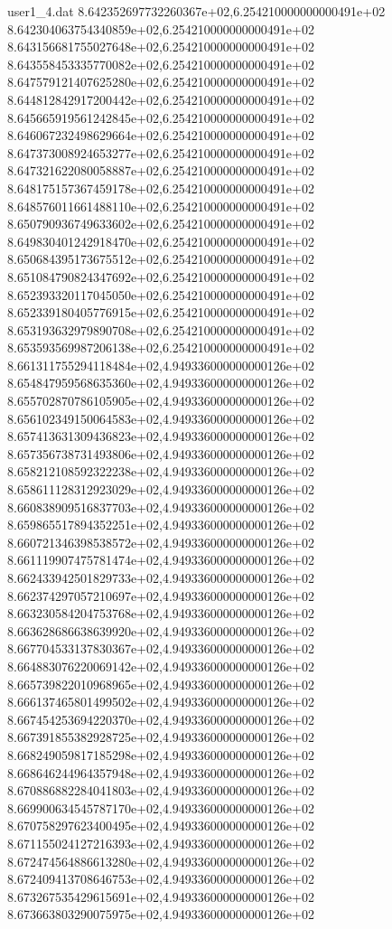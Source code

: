 \begin{filecontents}{user1_4.dat}
8.642352697732260367e+02,6.254210000000000491e+02
8.642304063754340859e+02,6.254210000000000491e+02
8.643156681755027648e+02,6.254210000000000491e+02
8.643558453335770082e+02,6.254210000000000491e+02
8.647579121407625280e+02,6.254210000000000491e+02
8.644812842917200442e+02,6.254210000000000491e+02
8.645665919561242845e+02,6.254210000000000491e+02
8.646067232498629664e+02,6.254210000000000491e+02
8.647373008924653277e+02,6.254210000000000491e+02
8.647321622080058887e+02,6.254210000000000491e+02
8.648175157367459178e+02,6.254210000000000491e+02
8.648576011661488110e+02,6.254210000000000491e+02
8.650790936749633602e+02,6.254210000000000491e+02
8.649830401242918470e+02,6.254210000000000491e+02
8.650684395173675512e+02,6.254210000000000491e+02
8.651084790824347692e+02,6.254210000000000491e+02
8.652393320117045050e+02,6.254210000000000491e+02
8.652339180405776915e+02,6.254210000000000491e+02
8.653193632979890708e+02,6.254210000000000491e+02
8.653593569987206138e+02,6.254210000000000491e+02
8.661311755294118484e+02,4.949336000000000126e+02
8.654847959568635360e+02,4.949336000000000126e+02
8.655702870786105905e+02,4.949336000000000126e+02
8.656102349150064583e+02,4.949336000000000126e+02
8.657413631309436823e+02,4.949336000000000126e+02
8.657356738731493806e+02,4.949336000000000126e+02
8.658212108592322238e+02,4.949336000000000126e+02
8.658611128312923029e+02,4.949336000000000126e+02
8.660838909516837703e+02,4.949336000000000126e+02
8.659865517894352251e+02,4.949336000000000126e+02
8.660721346398538572e+02,4.949336000000000126e+02
8.661119907475781474e+02,4.949336000000000126e+02
8.662433942501829733e+02,4.949336000000000126e+02
8.662374297057210697e+02,4.949336000000000126e+02
8.663230584204753768e+02,4.949336000000000126e+02
8.663628686638639920e+02,4.949336000000000126e+02
8.667704533137830367e+02,4.949336000000000126e+02
8.664883076220069142e+02,4.949336000000000126e+02
8.665739822010968965e+02,4.949336000000000126e+02
8.666137465801499502e+02,4.949336000000000126e+02
8.667454253694220370e+02,4.949336000000000126e+02
8.667391855382928725e+02,4.949336000000000126e+02
8.668249059817185298e+02,4.949336000000000126e+02
8.668646244964357948e+02,4.949336000000000126e+02
8.670886882284041803e+02,4.949336000000000126e+02
8.669900634545787170e+02,4.949336000000000126e+02
8.670758297623400495e+02,4.949336000000000126e+02
8.671155024127216393e+02,4.949336000000000126e+02
8.672474564886613280e+02,4.949336000000000126e+02
8.672409413708646753e+02,4.949336000000000126e+02
8.673267535429615691e+02,4.949336000000000126e+02
8.673663803290075975e+02,4.949336000000000126e+02

\end{filecontents}
